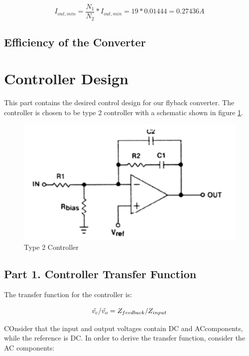 \documentclass[12pt]{article}
\begin{document}
\begin{equation*}
    I_{out,min}= \dfrac{N_{1}}{N_{2}}*I_{out,min}= 19*0.01444 = 0.27436 A
\end{equation*}
       
\subsection{Efficiency of the Converter}
       
       
\section{Controller Design}

This part contains the desired control design for our flyback converter. The controller is chosen to be type 2 controller with a schematic shown in figure \ref{fig:controller}.
\begin{figure}[H]
    \centering
    \includegraphics[width=15 cm]{controller}
    \caption{Type 2 Controller}
    \label{fig:controller}
\end{figure}

\subsection{Part 1. Controller Transfer Function}

The transfer function for the controller is:

\begin{equation*}
    \Tilde{v_{c}}/\Tilde{v_{o}}=Z_{feedback}/Z_{input}
\end{equation*}

COnsider that the input and output voltages contain DC and ACcomponents, while the reference is DC. In order to derive the transfer function, consider the AC components:
\end{document}

